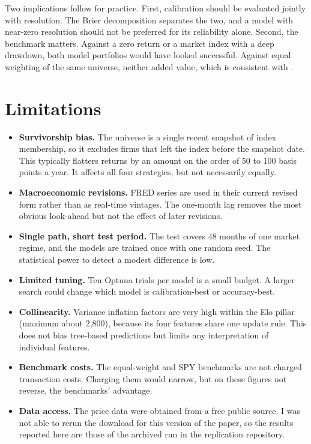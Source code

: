 \documentclass[11pt,a4paper]{article}
\begin{document}
Two implications follow for practice. First, calibration should be evaluated jointly with resolution. The Brier decomposition \citep{murphy1973} separates the two, and a model with near-zero resolution should not be preferred for its reliability alone. Second, the benchmark matters. Against a zero return or a market index with a deep drawdown, both model portfolios would have looked successful. Against equal weighting of the same universe, neither added value, which is consistent with \citet{demiguel2009}.

\section{Limitations}

\begin{itemize}
  \item \textbf{Survivorship bias.} The universe is a single recent snapshot of index membership, so it excludes firms that left the index before the snapshot date. This typically flatters returns by an amount on the order of 50 to 100 basis points a year. It affects all four strategies, but not necessarily equally.
  \item \textbf{Macroeconomic revisions.} FRED series are used in their current revised form rather than as real-time vintages. The one-month lag removes the most obvious look-ahead but not the effect of later revisions.
  \item \textbf{Single path, short test period.} The test covers 48 months of one market regime, and the models are trained once with one random seed. The statistical power to detect a modest difference is low.
  \item \textbf{Limited tuning.} Ten Optuna trials per model is a small budget. A larger search could change which model is calibration-best or accuracy-best.
  \item \textbf{Collinearity.} Variance inflation factors are very high within the Elo pillar (maximum about 2{,}800), because its four features share one update rule. This does not bias tree-based predictions but limits any interpretation of individual features.
  \item \textbf{Benchmark costs.} The equal-weight and SPY benchmarks are not charged transaction costs. Charging them would narrow, but on these figures not reverse, the benchmarks' advantage.
  \item \textbf{Data access.} The price data were obtained from a free public source. I was not able to rerun the download for this version of the paper, so the results reported here are those of the archived run in the replication repository.
\end{itemize}
\end{document}
